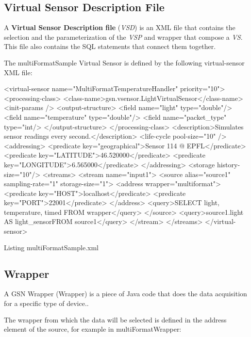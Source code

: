 \subsection{Virtual Sensor Description File }

A \textbf{Virtual Sensor Description file} (\textit{VSD}) is an XML
file that contains the selection and the parameterization of the
\textit{VSP} and wrapper that compose a \textit{VS}.  This file also
contains the SQL statements that connect them together.

The multiFormatSample Virtual Sensor is defined by the following
virtual-sensor XML file:

\begin{xmlcode}[caption={multiFormatSample.xml}, label=listing:mfs-vs]
<virtual-sensor name="MultiFormatTemperatureHandler" priority="10">
	<processing-class>
		<class-name>gsn.vsensor.LightVirtualSensor</class-name>
		<init-params />
		<output-structure>
			<field name="light" type="double"/>
			<field name="temperature" type="double"/>
			<field name="packet_type" type="int/>
		</output-structure>
	</processing-class>
	<description>Simulates sensor readings every second.</description>
	<life-cycle pool-size="10" />
	<addressing>
		<predicate key="geographical">Sensor 114 @ EPFL</predicate>
		<predicate key="LATITUDE">46.520000</predicate>
		<predicate key="LONGITUDE">6.565000</predicate>			
	</addressing>
	<storage history-size="10"/>
	<streams>
		<stream name="input1">
			<source alias="source1" sampling-rate="1" storage-size="1">
				<address wrapper="multiformat">
					<predicate key="HOST">localhost</predicate>
					<predicate key="PORT">22001</predicate>
				</address>
				<query>SELECT light, temperature, timed FROM wrapper</query>
			</source>
 			<query>source1.light AS light_sensorFROM source1</query>
		</stream>
	</streams>
</virtual-sensor>
\end{xmlcode}


Listing  multiFormatSample.xml

\subsection{Wrapper}

A GSN Wrapper (Wrapper) is a piece of Java code that does the data
acquisition for a specific type of device..

The wrapper from which the data will be selected is defined in the
address element of the source, for example in multiFormatWrapper:

